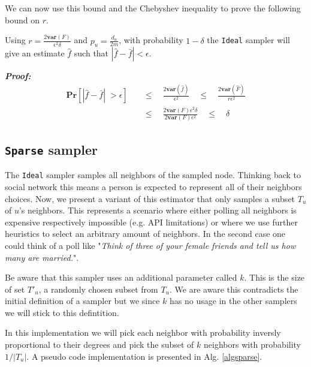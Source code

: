 We can now use this bound and the Chebyshev inequality to prove the following bound on $r$.

\begin{theorem}
Using $r = \frac{2\textbf{var}(F)}{\epsilon^2\delta}$ and $p_u = \frac{d_u}{2m}$, with probability $1-\delta$ the \texttt{Ideal} sampler will give an estimate $\hat{f}$ such that $|\hat{f}-\bar{f}|< \epsilon$.  
\end{theorem}
\textbf{\textit{Proof: }}
\begin{align*}
\textbf{Pr}[|\hat{f}-\bar{f}|\;>\epsilon] \quad&\leq\quad \frac{2\textbf{var}(\hat{f})}{\epsilon^2} \quad\leq\quad \frac{2\textbf{var}(\hat{F})}{r\epsilon^2} \\
&\leq\quad \frac{2\textbf{var}(F)\epsilon^2\delta}{2\textbf{var}(F)\epsilon^2} \quad\leq\quad \delta
\end{align*}

\subsection{\texttt{Sparse} sampler}
The \texttt{Ideal} sampler samples all neighbors of the sampled node. Thinking back to social network this means a person is expected to represent all of their neighbors choices.
Now, we present a variant of this estimator that only samples a subset $T_u$ of $u$'s neighbors.
This represents a scenario where either polling all neighbors is expensive respectively impossible (e.g. API limitations) or where we use further heuristics to select an arbitrary amount of neighbors. In the second case one could think of a poll like "\textit{Think of three of your female friends and tell us how many are married.}".

Be aware that this sampler uses an additional parameter called $k$. This is the size of set $T'_u$, a randomly chosen subset from $T_u$.
We are aware this contradicts the initial definition of a sampler but we since $k$ has no usage in the other samplers we will stick to this defintition.

In this implementation we will pick each neighbor with probability inversly proportional to their degrees and pick the subset of $k$ neighbors with probability $1/|T_u|$.
A pseudo code implementation is presented in Alg. \ref{algsparse}.

